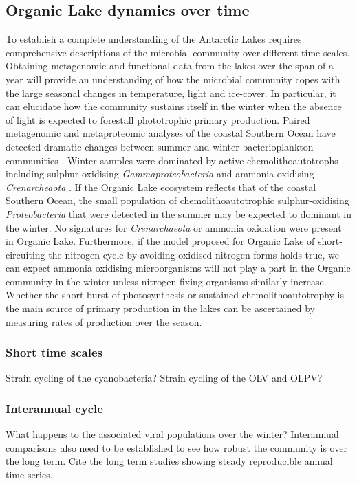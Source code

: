 \subsection{Organic Lake dynamics over time}
To establish a complete understanding of the Antarctic Lakes requires comprehensive descriptions of the microbial community over different time scales.
Obtaining metagenomic and functional data from the lakes over the span of a year will provide an understanding of how the microbial community copes with the large seasonal changes in temperature, light and ice-cover.
In particular, it can elucidate how the community sustains itself in the winter when the absence of light is expected to forestall phototrophic primary production.
Paired metagenomic and metaproteomic analyses of the coastal Southern Ocean have detected dramatic changes between summer and winter bacterioplankton communities \cite{Grzymski2012, Williams2012a}.
Winter samples were dominated by active chemolithoautotrophs including sulphur-oxidising \emph{Gammaproteobacteria} and ammonia oxidising \emph{Crenarcheaota} \cite{Grzymski2012, Williams2012b}.
If the Organic Lake ecosystem reflects that of the coastal Southern Ocean, the small population of chemolithoautotrophic sulphur-oxidising \emph{Proteobacteria} that were detected in the summer may be expected to dominant in the winter.
No signatures for \emph{Crenarchaeota} or ammonia oxidation were present in Organic Lake.
Furthermore, if the model proposed for Organic Lake of short-circuiting the nitrogen cycle by avoiding oxidised nitrogen forms holds true, we can expect ammonia oxidising microorganisms will not play a part in the Organic community in the winter unless nitrogen fixing organisms similarly increase.
Whether the short burst of photosynthesis or sustained chemolithoautotrophy is the main source of primary production in the lakes can be ascertained by measuring rates of production over the season.

\subsubsection{Short time scales}
Strain cycling of the cyanobacteria?
Strain cycling of the OLV and OLPV?

\subsubsection{Interannual cycle}
What happens to the associated viral populations over the winter?
Interannual comparisons also need to be established to see how robust the community is over the long term.
Cite the long term studies showing steady reproducible annual time series.

